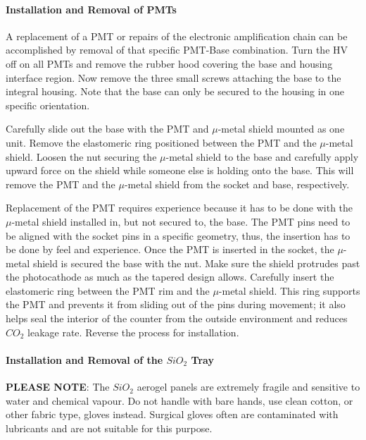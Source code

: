 \paragraph{Installation and Removal of PMTs}

A replacement of a PMT or repairs of the electronic amplification chain can   
be accomplished by removal of that specific PMT-Base combination. Turn the   
HV off on all PMTs and remove the rubber hood covering the base and housing 
interface region. Now remove the three small screws attaching the base to   
the integral housing. Note that the base can only be secured to the housing   
in one specific orientation. 

Carefully slide out the base with the PMT and $\mu$-metal shield mounted as one
unit. Remove the elastomeric ring positioned between the PMT and the   
$\mu$-metal shield. Loosen the nut securing the $\mu$-metal shield to the   
base and carefully apply upward force on the shield while someone else is   
holding onto the base. This will remove the PMT and the $\mu$-metal shield   
from the socket and base, respectively. 

Replacement of the PMT requires experience because it has to be done with the
$\mu$-metal shield installed in, but not secured to, the base. The PMT pins
need to be aligned with the socket pins in a specific geometry, thus, the
insertion has to be done by feel and experience. Once the PMT is inserted in
the socket, the $\mu$-metal shield is secured the base with the nut. Make sure
the shield protrudes past the photocathode as much as the tapered design
allows. Carefully insert the elastomeric ring between the PMT rim and the
$\mu$-metal shield. This ring supports the PMT and prevents it from sliding 
out of the pins during movement; it also helps seal the interior of the counter
from the outside environment and reduces $CO_2$ leakage rate. 
Reverse the process for installation.

\paragraph{Installation and Removal of the $SiO_2$ Tray}

{\bf PLEASE NOTE}: The $SiO_2$ aerogel panels are extremely fragile and sensitive to 
water and chemical vapour. Do not handle with bare hands, use clean cotton, or 
other fabric type, gloves instead. Surgical gloves often are contaminated with 
lubricants and are not suitable for this purpose. 

